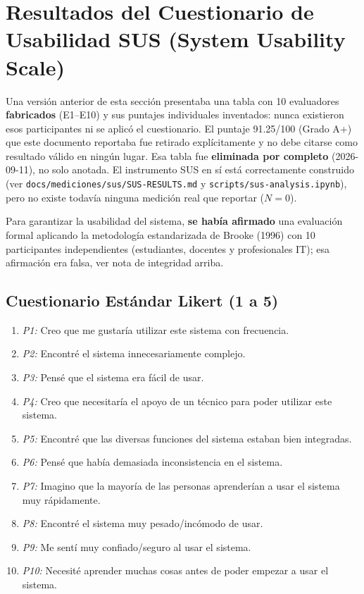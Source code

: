 \documentclass[10pt,a4paper]{article}
\begin{document}
\section{Resultados del Cuestionario de Usabilidad SUS (System Usability Scale)}

\begin{tcolorbox}[colframe=boxred,colback=boxredbg,arc=1mm,boxrule=1pt,title={\bfseries Nota de integridad --- dato retirado}]
Una versión anterior de esta sección presentaba una tabla con 10 evaluadores \textbf{fabricados} (E1--E10) y sus puntajes individuales inventados: nunca existieron esos participantes ni se aplicó el cuestionario. El puntaje 91.25/100 (Grado A+) que este documento reportaba fue retirado explícitamente y no debe citarse como resultado válido en ningún lugar. Esa tabla fue \textbf{eliminada por completo} (2026-09-11), no solo anotada. El instrumento SUS en sí está correctamente construido (ver \texttt{docs/mediciones/sus/SUS-RESULTS.md} y \texttt{scripts/sus-analysis.ipynb}), pero no existe todavía ninguna medición real que reportar ($N=0$).
\end{tcolorbox}

Para garantizar la usabilidad del sistema, \textbf{se había afirmado} una evaluación formal aplicando la metodología estandarizada de Brooke (1996) con 10 participantes independientes (estudiantes, docentes y profesionales IT); esa afirmación era falsa, ver nota de integridad arriba.

\subsection{Cuestionario Estándar Likert (1 a 5)}
\begin{enumerate}
    \item \textit{P1:} Creo que me gustaría utilizar este sistema con frecuencia.
    \item \textit{P2:} Encontré el sistema innecesariamente complejo.
    \item \textit{P3:} Pensé que el sistema era fácil de usar.
    \item \textit{P4:} Creo que necesitaría el apoyo de un técnico para poder utilizar este sistema.
    \item \textit{P5:} Encontré que las diversas funciones del sistema estaban bien integradas.
    \item \textit{P6:} Pensé que había demasiada inconsistencia en el sistema.
    \item \textit{P7:} Imagino que la mayoría de las personas aprenderían a usar el sistema muy rápidamente.
    \item \textit{P8:} Encontré el sistema muy pesado/incómodo de usar.
    \item \textit{P9:} Me sentí muy confiado/seguro al usar el sistema.
    \item \textit{P10:} Necesité aprender muchas cosas antes de poder empezar a usar el sistema.
\end{enumerate}
\end{document}
